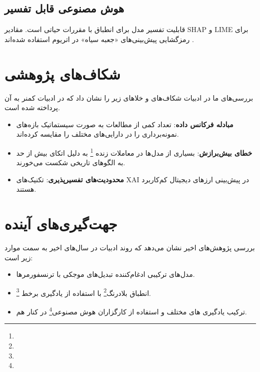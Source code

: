 {\subsection{هوش مصنوعی قابل تفسیر }
قابلیت تفسیر مدل برای انطباق با مقررات حیاتی است. مقادیر SHAP و LIME برای رمزگشایی پیش‌بینی‌های «جعبه سیاه» در اتریوم استفاده شده‌اند \cite{antulov2022explainable}.

\section{شکاف‌های پژوهشی}
بررسی‌های ما در ادبیات شکاف‌های و خلا‌های زیر را نشان داد که در ادبیات کمنر به آن پرداخته شده است.
\label{sec:critique}
\begin{itemize}
	\item \textbf{مبادله فرکانس داده}: تعداد کمی از مطالعات به صورت سیستماتیک بازه‌های نمونه‌برداری را در دارایی‌های مختلف  را مقایسه کرده‌اند.
	\item \textbf{خطای بیش‌برازش}: بسیاری از مدل‌ها در معاملات زنده \footnote{} به دلیل اتکای بیش از حد به الگوهای تاریخی شکست می‌خورند.
	\item \textbf{محدودیت‌های تفسیرپذیری}: تکنیک‌های XAI در پیش‌بینی ارزهای دیجیتال کم‌کاربرد هستند.
\end{itemize}


\section{جهت‌گیری‌های آینده}
بررسی پژوهش‌های اخیر نشان می‌دهد که روند ادبیات در سال‌های اخیر به سمت موارد زیر است:
\label{sec:future}
\begin{itemize}
	\item مدل‌های ترکیبی ادغام‌کننده تبدیل‌های موجکی با ترنسفورمرها.
	\item انطباق بلادرنگ\footnote{} با استفاده از یادگیری برخط \footnote{}.
	\item ترکیب‌ یادگیری های مختلف و استفاده از کارگزاران هوش مصنوعی\footnote{} در کنار هم. 
	
\end{itemize}


}
